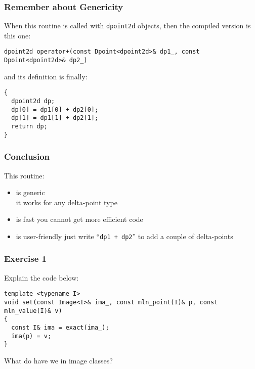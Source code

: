 \documentclass{beamer}
\newcommand{\code}[1]{{\scriptsize{\texttt{#1}}}\xspace}
\begin{document}
\begin{frame}[fragile]
  \frametitle{Remember about Genericity}

When this routine is called with \code{dpoint2d} objects, then
the compiled version is this one:

\begin{lstlisting}
dpoint2d operator+(const Dpoint<dpoint2d>& dp1_, const Dpoint<dpoint2d>& dp2_)
\end{lstlisting}

and its definition is finally:
\begin{lstlisting}
{
  dpoint2d dp;
  dp[0] = dp1[0] + dp2[0];
  dp[1] = dp1[1] + dp2[1];
  return dp;
}
\end{lstlisting}

\end{frame}



\begin{frame}
  \frametitle{Conclusion}

This routine:
  \smallskip

\begin{itemize}
\item is generic\\
  \scriptsize{it works for any delta-point type}
  \smallskip
\item is fast
  \scriptsize{you cannot get more efficient code}
  \smallskip
\item is user-friendly
  \scriptsize{just write ``\code{dp1 + dp2}'' to add a couple of delta-points}
\end{itemize}

\end{frame}



\begin{frame}[fragile]
  \frametitle{Exercise 1}

Explain the code below:

\begin{lstlisting}
template <typename I>
void set(const Image<I>& ima_, const mln_point(I)& p, const mln_value(I)& v)
{
  const I& ima = exact(ima_);
  ima(p) = v;
}
\end{lstlisting}

\smallskip

What do have we in image classes?

\end{frame}
\end{document}
